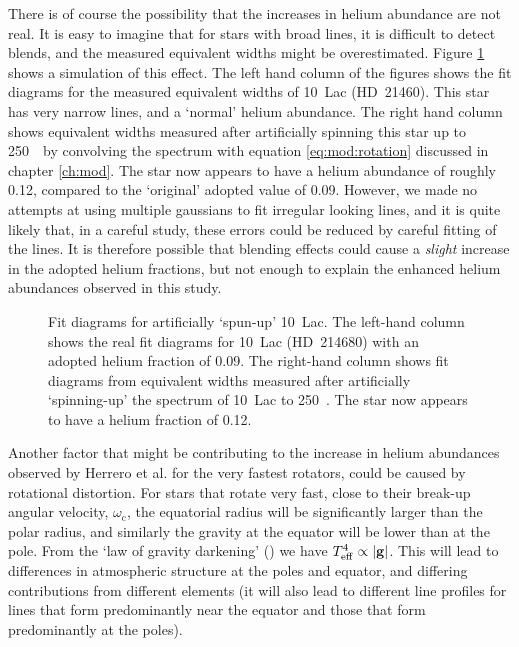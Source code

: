 There is of course the possibility that the increases in helium
abundance are not real. It is easy to imagine that for stars with broad
lines, it is difficult to detect blends, and the measured equivalent
widths might be overestimated. Figure \ref{fig:helium:hd214680_250}
shows a simulation of this effect. The left hand column of the figures
shows the fit diagrams for the measured equivalent widths of 10~Lac
(HD~21460). This star has very narrow lines, and a `normal' helium
abundance. The right hand column shows equivalent widths measured
after artificially spinning this star up to 250~\kms\ by convolving the
spectrum with equation \ref{eq:mod:rotation} discussed in chapter
\ref{ch:mod}. The star now appears to have a helium abundance of roughly
0.12, compared to the `original' adopted value of 0.09. However, we
made no attempts at using multiple gaussians to fit irregular looking
lines, and it is quite likely that, in a careful study, these errors
could be reduced by careful fitting of the lines. It is therefore
possible that blending effects could cause a \emph{slight} increase in
the adopted helium fractions, but not enough to explain the enhanced
helium abundances observed in this study.

\begin{figure} %
\epsfxsize=15cm
\caption[Fit diagrams for `spun-up' 10~Lac]
{\fcfont Fit diagrams for artificially `spun-up' 10~Lac.  The
left-hand column shows the real fit diagrams for 10~Lac (HD~214680)
with an adopted helium fraction of 0.09. The right-hand column shows
fit diagrams from equivalent widths measured after artificially
`spinning-up' the spectrum of 10~Lac to 250~\kms. The star now appears
to have a helium fraction of 0.12.}
\label{fig:helium:hd214680_250}
\end{figure}   %

Another factor that might be contributing to the increase in helium
abundances observed by Herrero et al. for the very fastest rotators,
could be caused by rotational distortion. For stars that rotate very
fast, close to their break-up angular velocity, $\omega_\mathrm{c}$,
the equatorial radius will be significantly larger than the polar
radius, and similarly the gravity at the equator will be lower than at
the pole.  From the `law of gravity darkening' (\cite{zeipel}) we have
$T_{\mathrm{eff}}^4 \propto |\mathbf{g}|$. This will lead to differences in
atmospheric structure at the poles and equator, and differing
contributions from different elements (it will also lead to different
line profiles for lines that form predominantly near the equator and
those that form predominantly at the poles).

